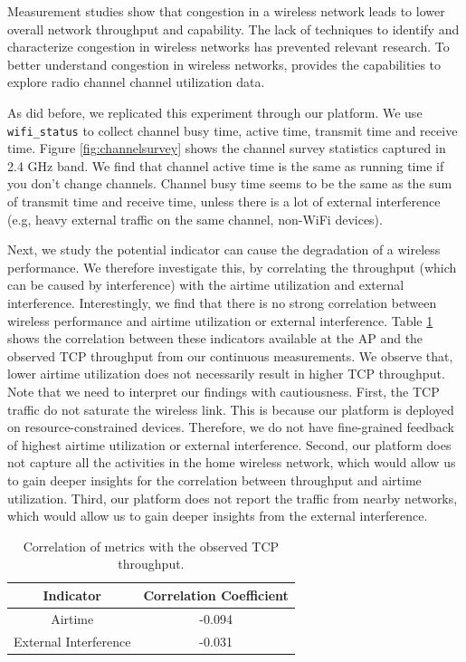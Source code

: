 Measurement studies show that congestion in a wireless network leads to lower overall network throughput and capability. The lack of techniques to identify and characterize congestion in wireless networks has prevented relevant research. To better understand congestion in wireless networks, \sysname provides the capabilities to explore radio channel channel utilization data. 

As \cite{channelsurvey} did before, we replicated this experiment through our \sysname platform. We use \texttt{wifi\_status} to collect channel busy time, active time, transmit time and receive time. Figure \ref{fig:channelsurvey} shows the channel survey statistics captured in 2.4 GHz band. We find that channel active time is the same as running time if you don't change channels. Channel busy time seems to be the same as the sum of transmit time and receive time, unless there is a lot of external interference (e.g, heavy external traffic on the same channel, non-WiFi devices).

Next, we study the potential indicator can cause the degradation of a wireless performance. We therefore investigate this, by correlating the throughput (which can be caused by interference) with the airtime utilization and external interference. Interestingly, we find that there is no strong correlation between wireless performance and airtime utilization or external interference. Table \ref{table: Correlation} shows the correlation between these indicators available at the AP and the observed TCP throughput from our continuous measurements. We observe that, lower airtime utilization does not necessarily result in higher TCP throughput. Note that we need to interpret our findings with cautiousness. First, the TCP traffic do not saturate the wireless link. This is because our platform is deployed on resource-constrained devices. Therefore, we do not have fine-grained feedback of highest airtime utilization or external interference. Second, our platform does not capture all the activities in the home wireless network, which would allow us to gain deeper insights for the correlation between throughput and airtime utilization. Third, our platform does not report the traffic from nearby networks, which would allow us to gain deeper insights from the external interference.

\begin{table}[]
\centering
\begin{tabular}{ |c|c| }
\hline
Indicator               & Correlation Coefficient  \\ 
\hline
Airtime               & -0.094  \\ 
\hline
External Interference & -0.031 \\ 
\hline
\end{tabular}
\caption{Correlation of metrics with the observed TCP throughput.}
\label{table: Correlation}
\end{table}

